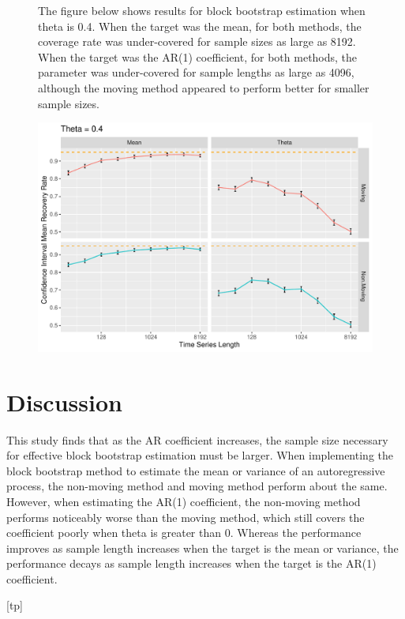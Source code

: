 \documentclass[12pt, letterpaper, titlepage]{article}
\begin{document}
\begin{figure}[tbp]
\caption{The figure below shows results for block bootstrap estimation when theta is 0.4. When the target was the mean, for both methods, the coverage rate was under-covered for sample sizes as large as 8192. When the target was the AR(1) coefficient, for both methods, the parameter was under-covered for sample lengths as large as 4096, although the moving method appeared to perform better for smaller sample sizes. }
  \centering
  \includegraphics[width=\textwidth]{theta_0.4}
  \caption{}
  \label{fig:theta_0.4}
\end{figure}

\section{Discussion}
\label{sec:discuss}

This study finds that as the AR coefficient increases, the sample size necessary for effective block bootstrap estimation must be larger. When implementing the block bootstrap method to estimate the mean or variance of an autoregressive process, the non-moving method and moving method perform about the same. However, when estimating the AR(1) coefficient, the non-moving method performs noticeably worse than the moving method, which still covers the coefficient poorly when theta is greater than 0. Whereas the performance improves as sample length increases when the target is the mean or variance, the performance decays as sample length increases when the target is the AR(1) coefficient.




[tp]
\end{document}
